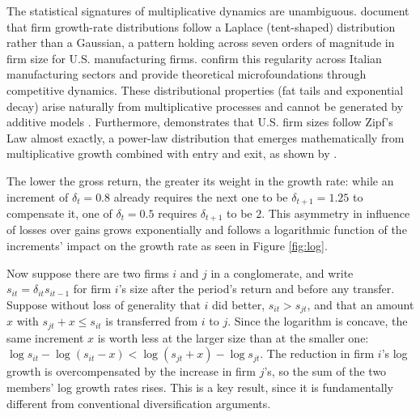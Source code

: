 \documentclass[12pt,a4paper]{article}
\begin{document}
The statistical signatures of multiplicative dynamics are unambiguous. \textcite{stanley1996scaling} document that firm growth-rate distributions follow a Laplace (tent-shaped) distribution rather than a Gaussian, a pattern holding across seven orders of magnitude in firm size for U.S. manufacturing firms. \textcite{bottazzi2006explaining} confirm this regularity across Italian manufacturing sectors and provide theoretical microfoundations through competitive dynamics. These distributional properties (fat tails and exponential decay) arise naturally from multiplicative processes and cannot be generated by additive models \parencite{nair2022fundamentals}. Furthermore, \textcite{axtell2001zipf} demonstrates that U.S. firm sizes follow Zipf's Law almost exactly, a power-law distribution that emerges mathematically from multiplicative growth combined with entry and exit, as shown by \textcite{gabaix1999zipf}.

The lower the gross return, the greater its weight in the growth rate: while an increment of $\delta_t = 0.8$ already requires the next one to be $\delta_{t + 1} = 1.25$ to compensate it, one of $\delta_t = 0.5$ requires $\delta_{t+1}$ to be $2$. This asymmetry in influence of losses over gains grows exponentially and follows a logarithmic function of the increments' impact on the growth rate as seen in Figure \ref{fig:log}. 

Now suppose there are two firms $i$ and $j$ in a conglomerate, and write $s_{it} = \delta_{it} s_{it-1}$ for firm $i$'s size after the period's return and before any transfer. Suppose without loss of generality that $i$ did better, $s_{it} > s_{jt}$, and that an amount $x$ with $s_{jt} + x \leq s_{it}$ is transferred from $i$ to $j$. Since the logarithm is concave, the same increment $x$ is worth less at the larger size than at the smaller one: $\log s_{it} - \log(s_{it} - x) < \log(s_{jt} + x) - \log s_{jt}$. The reduction in firm $i$'s log growth is overcompensated by the increase in firm $j$'s, so the sum of the two members' log growth rates rises. This is a key result, since it is fundamentally different from conventional diversification arguments.
\end{document}
